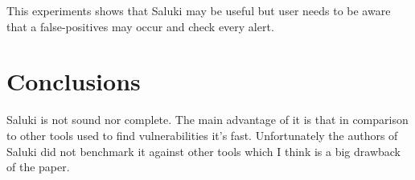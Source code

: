 \documentclass[a4paper, 12pt, journal, onecolumn]{IEEEtran}
\begin{document}
This experiments shows that Saluki may be useful but user needs to be aware that a false-positives may occur and check every alert. 


\section{Conclusions}

Saluki is not sound nor complete. The main advantage of it is that in comparison to other tools used to find vulnerabilities it’s fast. Unfortunately the authors of Saluki did not benchmark it against other tools which I think is a big drawback of the paper.




\end{document}

